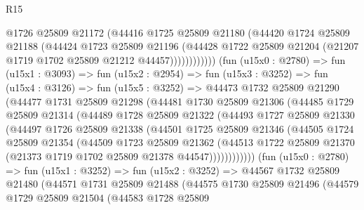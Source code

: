 \begin{lexlean}{R15}
\begin{coremodule}
                      @1726
                      @25809
                      @21172
                      (@44416
                        @1725
                        @25809
                        @21180
                        (@44420
                          @1724
                          @25809
                          @21188
                          (@44424
                            @1723
                            @25809
                            @21196
                            (@44428
                              @1722
                              @25809
                              @21204
                              (@21207 @1719 @1702 @25809 @21212 @44457))))))))))))
        (fun (u15x0 : @2780) =>
        fun (u15x1 : @3093) =>
        fun (u15x2 : @2954) =>
        fun (u15x3 : @3252) =>
        fun (u15x4 : @3126) =>
        fun (u15x5 : @3252) =>
        @44473
          @1732
          @25809
          @21290
          (@44477
            @1731
            @25809
            @21298
            (@44481
              @1730
              @25809
              @21306
              (@44485
                @1729
                @25809
                @21314
                (@44489
                  @1728
                  @25809
                  @21322
                  (@44493
                    @1727
                    @25809
                    @21330
                    (@44497
                      @1726
                      @25809
                      @21338
                      (@44501
                        @1725
                        @25809
                        @21346
                        (@44505
                          @1724
                          @25809
                          @21354
                          (@44509
                            @1723
                            @25809
                            @21362
                            (@44513
                              @1722
                              @25809
                              @21370
                              (@21373 @1719 @1702 @25809 @21378 @44547))))))))))))
        (fun (u15x0 : @2780) =>
        fun (u15x1 : @3252) =>
        fun (u15x2 : @3252) =>
        @44567
          @1732
          @25809
          @21480
          (@44571
            @1731
            @25809
            @21488
            (@44575
              @1730
              @25809
              @21496
              (@44579
                @1729
                @25809
                @21504
                (@44583
                  @1728
                  @25809

\end{coremodule}
\end{lexlean}
